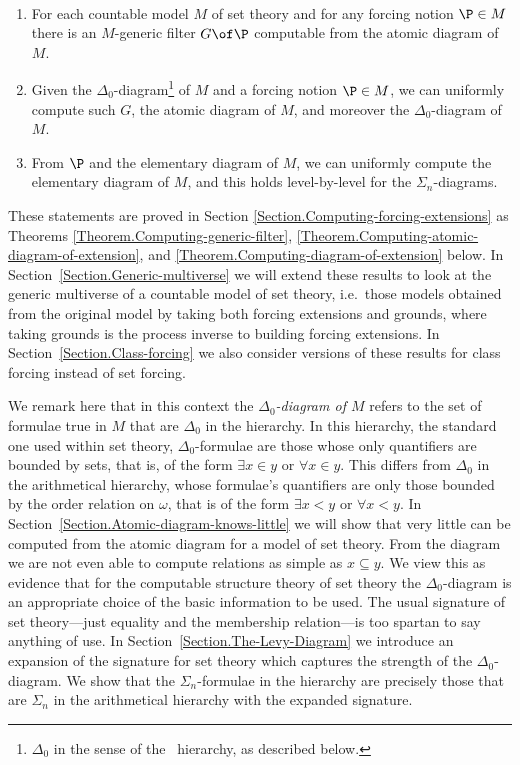 \documentclass{amsart}
\begin{document}
 \begin{maintheorem}\label{MainTheorem}\
   \begin{enumerate}
     \item
     For each countable model $M$ of set theory and for any forcing notion $\P\in M$
     there is an $M$-generic filter $G\of\P$ computable from the atomic diagram of $M$.
     \item Given the $\Delta_0$-diagram\footnote{$\Delta_0$ in the sense of the \Levy\ hierarchy, as described below.} of $M$ and a forcing notion $\P\in M$, we can uniformly compute such $G$, the atomic diagram of $M$, and moreover the $\Delta_0$-diagram of $M$.
     \item From $\P$ and the elementary diagram of $M$, we can uniformly compute the elementary diagram of $M$, and this holds level-by-level for the $\Sigma_n$-diagrams.
   \end{enumerate}
 \end{maintheorem}
 
 \noindent These statements are proved in Section \ref{Section.Computing-forcing-extensions} as Theorems \ref{Theorem.Computing-generic-filter}, \ref{Theorem.Computing-atomic-diagram-of-extension}, and \ref{Theorem.Computing-diagram-of-extension} below. In Section~\ref{Section.Generic-multiverse} we will extend these results to look at the generic multiverse of a countable model of set theory, i.e.\ those models obtained from the original model by taking both forcing extensions and grounds, where taking grounds is the process inverse to building forcing extensions.  In Section~\ref{Section.Class-forcing} we also consider versions of these results for class forcing instead of set forcing.
 
 We remark here that in this context the \emph{$\Delta_0$-diagram of $M$} refers to the set of formulae true in $M$ that are $\Delta_0$ in the \Levy{} hierarchy. In this hierarchy, the standard one used within set theory, $\Delta_0$-formulae are those whose only quantifiers are bounded by sets, that is, of the form $\exists x \in y$ or $\forall x \in y$. This differs from $\Delta_0$ in the arithmetical hierarchy, whose formulae's quantifiers are only those bounded by the order relation on $\omega$, that is of the form $\exists x < y$ or $\forall x < y$. In Section~\ref{Section.Atomic-diagram-knows-little} we will show that very little can be computed from the atomic diagram for a model of set theory. From the diagram we are not even able to compute relations as simple as $x \subseteq y$. We view this as evidence that for the computable structure theory of set theory the \Levy{} $\Delta_0$-diagram is an appropriate choice of the basic information to be used. The usual signature of set theory---just equality and the membership relation---is too spartan to say anything of use. In Section~\ref{Section.The-Levy-Diagram} we introduce an expansion of the signature for set theory which captures the strength of the \Levy{} $\Delta_0$-diagram. We show that the $\Sigma_n$-formulae in the \Levy{} hierarchy are precisely those that are $\Sigma_n$ in the arithmetical hierarchy with the expanded signature.
 
\end{document}
